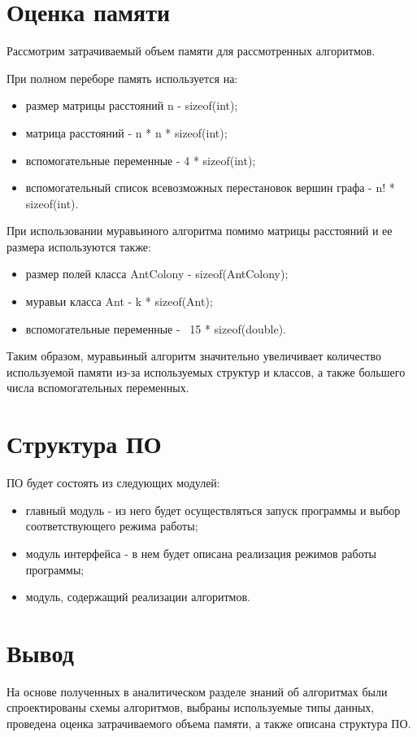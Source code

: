\section{Оценка памяти}

Рассмотрим затрачиваемый объем памяти для рассмотренных алгоритмов. 

При полном переборе память используется на:
\begin{itemize}
	\item размер матрицы расстояний n - sizeof(int);
	\item матрица расстояний - n * n * sizeof(int);
	\item вспомогательные переменные - 4 * sizeof(int);
	\item вспомогательный список всевозможных перестановок вершин графа - n! * sizeof(int).
\end{itemize}

При использовании муравьиного алгоритма помимо матрицы расстояний и ее размера используются также:
\begin{itemize}
	\item размер полей класса AntColony - sizeof(AntColony);
	\item муравьи класса Ant - k * sizeof(Ant);
	\item вспомогательные переменные - ~15 * sizeof(double).
\end{itemize}

Таким образом, муравьиный алгоритм значительно увеличивает количество используемой памяти из-за используемых структур и классов, а также большего числа вспомогательных переменных.

\section{Структура ПО}

ПО будет состоять из следующих модулей:
\begin{itemize}
	\item главный модуль - из него будет осуществляться запуск программы и выбор соответствующего режима работы;
	\item модуль интерфейса - в нем будет описана реализация режимов работы программы;
	\item модуль, содержащий реализации алгоритмов.
\end{itemize}

\section{Вывод}

На основе полученных в аналитическом разделе знаний об алгоритмах были спроектированы схемы алгоритмов, выбраны используемые типы данных, проведена оценка затрачиваемого объема памяти, а также описана структура ПО.